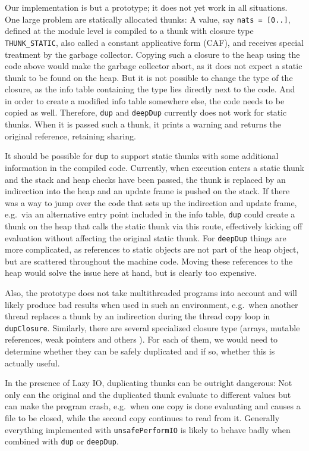 \documentclass[preprint]{sigplanconf}
\theoremstyle{nonumberplain}
\newcommand{\li}{\lstinline[style=Haskell]}
\newcommand{\ci}{\lstinline[style=Cmm]}
\begin{document}
Our implementation is but a prototype; it does not yet work in all situations. One large problem are statically allocated thunks: A value, say \li-nats = [0..]-, defined at the module level is compiled to a thunk with closure type \ci-THUNK_STATIC-, also called a constant applicative form (CAF), and receives special treatment by the garbage collector. Copying such a closure to the heap using the code above would make the garbage collector abort, as it does not expect a static thunk to be found on the heap. But it is not possible to change the type of the closure, as the info table containing the type lies directly next to the code. And in order to create a modified info table somewhere else, the code needs to be copied as well. Therefore, \li-dup- and \li-deepDup- currently does not work for static thunks. When it is passed such a thunk, it prints a warning and returns the original reference, retaining sharing.

It should be possible for \li-dup- to support static thunks with some additional information in the compiled code.  Currently, when execution enters a static thunk and the stack and heap checks have been passed, the thunk is replaced by an indirection into the heap and an update frame is pushed on the stack. If there was a way to jump over the code that sets up the indirection and update frame, e.g.\ via an alternative entry point included in the info table, \li-dup- could create a thunk on the heap that calls the static thunk via this route, effectively kicking off evaluation without affecting the original static thunk.  For \li-deepDup- things are more complicated, as references to static objects are not part of the heap object, but are scattered throughout the machine code. Moving these references to the heap would solve the issue here at hand, but is clearly too expensive.

Also, the prototype does not take multithreaded programs into account and will likely produce bad results when used in such an environment, e.g.\ when another thread replaces a thunk by an indirection during the thread copy loop in \ci-dupClosure-. Similarly, there are several specialized closure type (arrays, mutable references, weak pointers\citep{weakpointers} and others \citep[page HeapObjects]{commentary}). For each of them, we would need to determine whether they can be safely duplicated and if so, whether this is actually useful.

In the presence of Lazy IO, duplicating thunks can be outright dangerous: Not only can the original and the duplicated thunk evaluate to different values but can make the program crash, e.g.\ when one copy is done evaluating and causes a file to be closed, while the second copy continues to read from it. Generally everything implemented with \li-unsafePerformIO- is likely to behave badly when combined with \li-dup- or \li-deepDup-.
\end{document}
